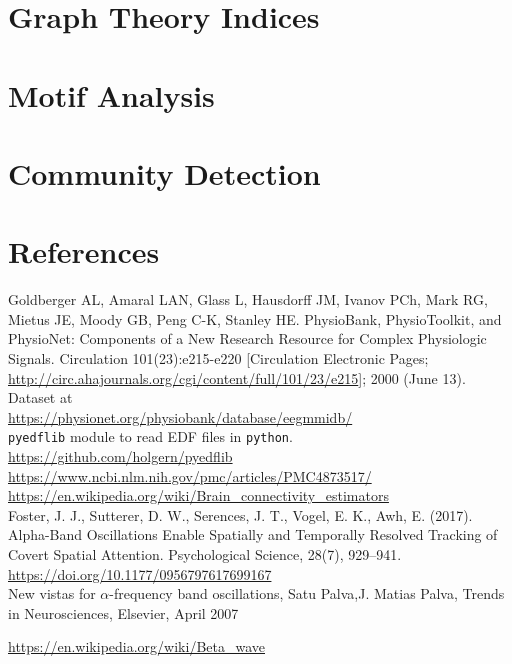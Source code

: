 \documentclass[%
 aip,
 jmp,%
 amsmath,amssymb,
 reprint,%
]{revtex4-1}
\begin{document}
\section{\label{sec:level1}Graph Theory Indices}

\section{\label{sec:level1}Motif Analysis}

\section{\label{sec:level1}Community Detection}

 	
\section{References}
\begin{thebibliography}{}
	Goldberger AL, Amaral LAN, Glass L, Hausdorff JM, Ivanov PCh, Mark RG, Mietus JE, Moody GB, Peng C-K, Stanley HE. PhysioBank, PhysioToolkit, and PhysioNet: Components of a New Research Resource for Complex Physiologic Signals. Circulation 101(23):e215-e220 [Circulation Electronic Pages; \url{http://circ.ahajournals.org/cgi/content/full/101/23/e215}]; 2000 (June 13). Dataset at \\
	\url{https://physionet.org/physiobank/database/eegmmidb/}\\
	
	 \verb|pyedflib| module to read EDF files in \verb|python|. \url{https://github.com/holgern/pyedflib}\\
	
	\url{https://www.ncbi.nlm.nih.gov/pmc/articles/PMC4873517/}\\
	
	\url{https://en.wikipedia.org/wiki/Brain_connectivity_estimators}\\
	
	Foster, J. J., Sutterer, D. W., Serences, J. T., Vogel, E. K., Awh, E. (2017). Alpha-Band Oscillations Enable Spatially and Temporally Resolved Tracking of Covert Spatial Attention. Psychological Science, 28(7), 929–941. \url{https://doi.org/10.1177/0956797617699167}\\
	
	New vistas for $\alpha$-frequency band oscillations, Satu Palva,J. Matias Palva, Trends in Neurosciences, Elsevier, April 2007
	
	\url{https://en.wikipedia.org/wiki/Beta_wave}
	
\end{thebibliography}
\end{document}
